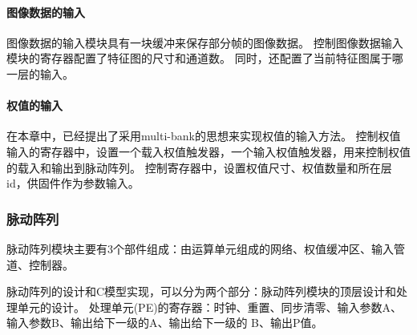 \paragraph{图像数据的输入}
图像数据的输入模块具有一块缓冲来保存部分帧的图像数据。
控制图像数据输入模块的寄存器配置了特征图的尺寸和通道数。
同时，还配置了当前特征图属于哪一层的输入。


\paragraph{权值的输入}
在本章中，已经提出了采用multi-bank的思想来实现权值的输入方法。
控制权值输入的寄存器中，设置一个载入权值触发器，一个输入权值触发器，用来控制权值的载入和输出到脉动阵列。
控制寄存器中，设置权值尺寸、权值数量和所在层id，供固件作为参数输入。


\subsubsection{脉动阵列}
脉动阵列模块主要有3个部件组成：由运算单元组成的网络、权值缓冲区、输入管道、控制器。


  
脉动阵列的设计和C模型实现，可以分为两个部分：脉动阵列模块的顶层设计和处理单元的设计。
处理单元(PE)的寄存器：时钟、重置、同步清零、输入参数A、输入参数B、输出给下一级的A、输出给下一级的
B、输出P值。


